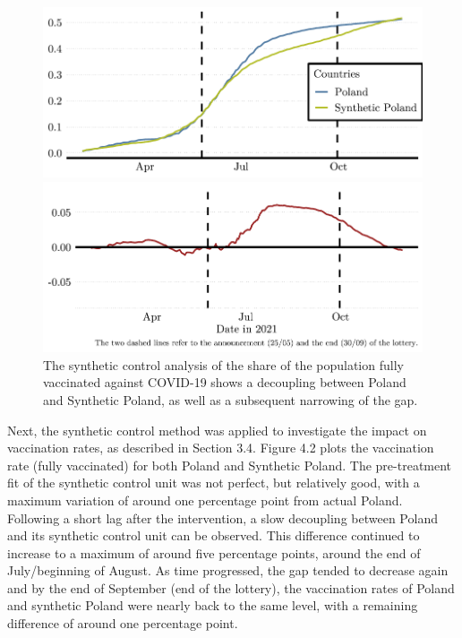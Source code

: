 \documentclass{scrbook}
\begin{document}
\begin{figure}[h]
\caption[Synthetic control analysis of the Polish lottery (share of the fully vaccinated)]{The synthetic control analysis of the share of the population fully vaccinated against COVID-19 shows a decoupling between Poland and Synthetic Poland, as well as a subsequent narrowing of the gap.}

\begin{center}\includegraphics{bachelor_thesis_files/figure-latex/unnamed-chunk-3-1} \end{center}



\begin{center}\includegraphics{bachelor_thesis_files/figure-latex/unnamed-chunk-3-2} \end{center}
\end{figure}

\vspace{-0.5cm}

Next, the synthetic control method was applied to investigate the impact
on vaccination rates, as described in Section 3.4. Figure 4.2 plots the
vaccination rate (fully vaccinated) for both Poland and Synthetic
Poland. The pre-treatment fit of the synthetic control unit was not
perfect, but relatively good, with a maximum variation of around one
percentage point from actual Poland. Following a short lag after the
intervention, a slow decoupling between Poland and its synthetic control
unit can be observed. This difference continued to increase to a maximum
of around five percentage points, around the end of July/beginning of
August. As time progressed, the gap tended to decrease again and by the
end of September (end of the lottery), the vaccination rates of Poland
and synthetic Poland were nearly back to the same level, with a
remaining difference of around one percentage point.
\end{document}

